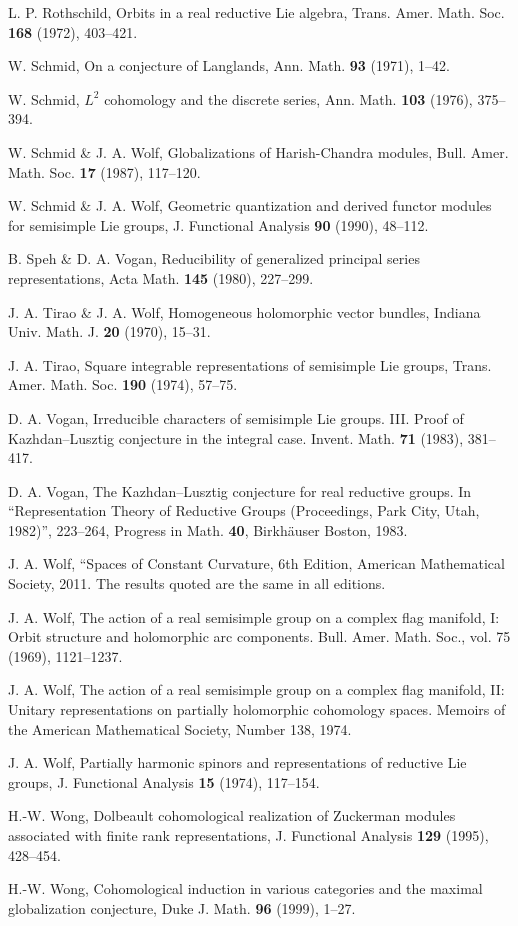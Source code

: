 \documentclass{conm-p-l}
\begin{document}
\begin{thebibliography}{XX}
L. P. Rothschild, 
Orbits in a real  reductive Lie algebra, Trans. Amer. Math. Soc. {\bf 168}
(1972), 403--421.

W. Schmid,
On a conjecture of Langlands, Ann. Math. {\bf 93} (1971), 1--42.

W. Schmid, $L^2$ cohomology and the discrete series, Ann. Math. {\bf 103}
(1976), 375--394.

W. Schmid \& J. A. Wolf,
Globalizations of Harish-Chandra modules, Bull. Amer. Math. Soc. 
{\bf 17} (1987), 117--120.

W. Schmid \& J. A. Wolf,
Geometric quantization and derived functor modules for semisimple Lie groups,
J. Functional Analysis {\bf 90} (1990), 48--112.

B. Speh \& D. A. Vogan, 
Reducibility of generalized principal series representations,
Acta Math. {\bf 145} (1980), 227--299.

J. A. Tirao \& J. A. Wolf,
Homogeneous holomorphic vector bundles,
Indiana Univ. Math. J. {\bf 20} (1970), 15--31.

J. A. Tirao,
Square integrable representations of semisimple Lie groups, 
Trans. Amer. Math. Soc. {\bf 190} (1974), 57--75.

D. A. Vogan, 
Irreducible characters of semisimple Lie groups. III. Proof of 
Kazhdan--Lusztig conjecture in the integral case. Invent. Math. {\bf 71} 
(1983), 381--417.

D. A. Vogan, 
The Kazhdan--Lusztig conjecture for real reductive groups. 
In ``Representation Theory of Reductive Groups (Proceedings, 
Park City, Utah, 1982)'', 223--264, Progress in Math. {\bf 40}, 
Birkh\"auser Boston, 1983.

J. A. Wolf, ``Spaces of Constant Curvature, 6th Edition, 
American Mathematical Society, 2011.  The results quoted are the same in
all editions.

J. A. Wolf,
The action of a real semisimple group on a complex flag manifold, I: 
Orbit structure and holomorphic arc components. 
Bull. Amer. Math. Soc., vol. 75 (1969), 
1121--1237.

J. A. Wolf,
The action of a real semisimple group on a complex flag manifold, II: 
Unitary representations on partially holomorphic cohomology spaces. 
Memoirs of the American Mathematical Society, Number 138, 1974.

J. A. Wolf,
Partially harmonic spinors and representations of reductive Lie groups, 
J. Functional Analysis {\bf 15} (1974), 117--154.

H.-W. Wong,
Dolbeault cohomological realization of Zuckerman modules associated with
finite rank representations, J. Functional Analysis {\bf 129} (1995),
428--454.

H.-W. Wong,
Cohomological induction in various categories and the maximal globalization
conjecture, Duke J. Math. {\bf 96} (1999), 1--27.

\end{thebibliography}
\end{document}
